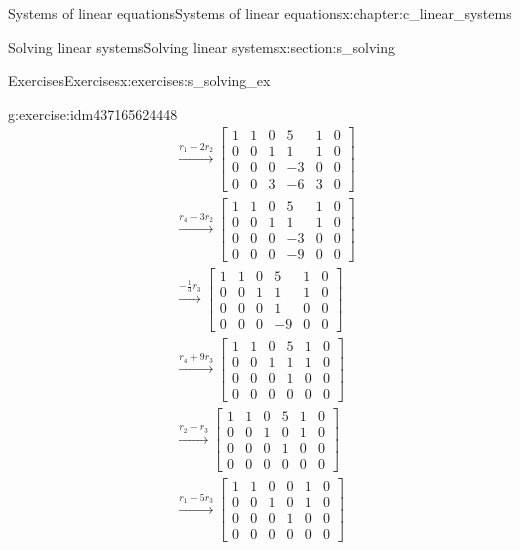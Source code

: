 \documentclass[oneside,10pt,]{book}
\numberwithin{equation}{section}
\newcommand{\amp}{&}
\begin{document}
\begin{chapterptx}{Systems of linear equations}{}{Systems of linear equations}{}{}{x:chapter:c_linear_systems}
\begin{sectionptx}{Solving linear systems}{}{Solving linear systems}{}{}{x:section:s_solving}
\begin{exercises-subsection-numberless}{Exercises}{}{Exercises}{}{}{x:exercises:s_solving_ex}
\begin{exercisegroup}
\begin{divisionexerciseeg}{5}{}{}{g:exercise:idm437165624448}
\begin{align*}
\amp \xrightarrow[]{r_1-2r_2} \begin{bmatrix}1\amp 1\amp 0\amp 5\amp 1\amp 0\\ 0\amp 0\amp 1\amp 1\amp 1\amp 0\\ 0\amp 0\amp 0\amp -3\amp 0\amp 0\\ 0\amp 0\amp 3\amp -6\amp 3\amp 0 \end{bmatrix}\\
\amp \xrightarrow[]{r_4-3r_2} \begin{bmatrix}1\amp 1\amp 0\amp 5\amp 1\amp 0\\ 0\amp 0\amp 1\amp 1\amp 1\amp 0\\ 0\amp 0\amp 0\amp -3\amp 0\amp 0\\ 0\amp 0\amp 0\amp -9\amp 0\amp 0 \end{bmatrix}\\
\amp \xrightarrow[]{-\frac{1}{3}r_3} \begin{bmatrix}1\amp 1\amp 0\amp 5\amp 1\amp 0\\ 0\amp 0\amp 1\amp 1\amp 1\amp 0\\ 0\amp 0\amp 0\amp 1\amp 0\amp 0\\ 0\amp 0\amp 0\amp -9\amp 0\amp 0 \end{bmatrix}\\
\amp \xrightarrow[]{r_4+9r_3} \begin{bmatrix}1\amp 1\amp 0\amp 5\amp 1\amp 0\\ 0\amp 0\amp 1\amp 1\amp 1\amp 0\\ 0\amp 0\amp 0\amp 1\amp 0\amp 0\\ 0\amp 0\amp 0\amp 0\amp 0\amp 0 \end{bmatrix}\\
\amp \xrightarrow[]{r_2-r_3} \begin{bmatrix}1\amp 1\amp 0\amp 5\amp 1\amp 0\\ 0\amp 0\amp 1\amp 0\amp 1\amp 0\\ 0\amp 0\amp 0\amp 1\amp 0\amp 0\\ 0\amp 0\amp 0\amp 0\amp 0\amp 0 \end{bmatrix}\\
\amp \xrightarrow[]{r_1-5r_3} \begin{bmatrix}1\amp 1\amp 0\amp 0\amp 1\amp 0\\ 0\amp 0\amp 1\amp 0\amp 1\amp 0\\ 0\amp 0\amp 0\amp 1\amp 0\amp 0\\ 0\amp 0\amp 0\amp 0\amp 0\amp 0 \end{bmatrix}
\end{align*}

\end{divisionexerciseeg}
\end{exercisegroup}
\end{exercises-subsection-numberless}
\end{sectionptx}
\end{chapterptx}
\end{document}
